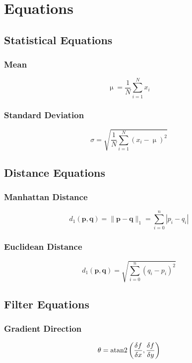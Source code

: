 \section{Equations}

\subsection{Statistical Equations}

\subsubsection{Mean}
\begin{equation}
\upmu = \frac{1}{N}\sum_{i=1}^{N}x_i
\end{equation}

\subsubsection{Standard Deviation}
\begin{equation}
\sigma = \sqrt{\frac{1}{N}\sum_{i=1}^{N}(x_i - \upmu)^2}
\end{equation}

\subsection{Distance Equations}

\subsubsection{Manhattan Distance}
\begin{equation}
d_1(\mathbf{p},\mathbf{q}) = \|\mathbf{p}-\mathbf{q}\|_1 = \sum^{n}_{i=0}{|p_i-q_i|}
\end{equation}

\subsubsection{Euclidean Distance}
\begin{equation}
d_1(\mathbf{p}, \mathbf{q}) = \sqrt{\sum^{n}_{i=0}({q_i-p_i})^2}
\end{equation}

\subsection{Filter Equations}

\subsubsection{Gradient Direction}
\begin{equation}
\theta = {\rm atan2}\left( \frac{\delta f}{\delta x}, \frac{\delta f}{\delta y} \right)
\end{equation}

